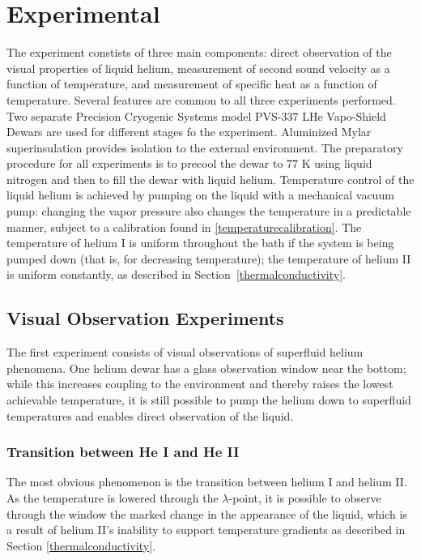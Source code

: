 
\section{Experimental}\label{experimental}

The experiment constists of three main components: direct observation
of the visual properties of liquid helium, measurement of second sound
velocity as a function of temperature, and measurement of specific
heat as a function of temperature. Several features are common to all
three experiments performed. Two separate Precision Cryogenic Systems
model PVS-337 LHe Vapo-Shield Dewars are used for different stages fo
the experiment. Aluminized Mylar superinsulation provides isolation to
the external environment. The preparatory procedure for all
experiments is to precool the dewar to $77$ K using liquid nitrogen
and then to fill the dewar with liquid helium. Temperature control of
the liquid helium is achieved by pumping on the liquid with a
mechanical vacuum pump: changing the vapor pressure also changes the
temperature in a predictable manner, subject to a calibration found in
\ref{temperaturecalibration}. The temperature of helium I is uniform
throughout the bath if the system is being pumped down (that is, for
decreasing temperature); the temperature of helium II is uniform
constantly, as described in Section~\ref{thermalconductivity}.

\subsection{Visual Observation Experiments}

The first experiment consists of visual observations of superfluid
helium phenomena. One helium dewar has a glass observation window near
the bottom; while this increases coupling to the environment and
thereby raises the lowest achievable temperature, it is still possible
to pump the helium down to superfluid temperatures and enables direct
observation of the liquid.

\subsubsection{Transition between He I and He II}

The most obvious phenomenon is the transition between helium I and helium II. As the temperature is lowered through the $\lambda$-point, it is possible to observe through the window the marked change in the appearance of the liquid, which is a result of helium II's inability to support temperature gradients as described in Section \ref{thermalconductivity}.

